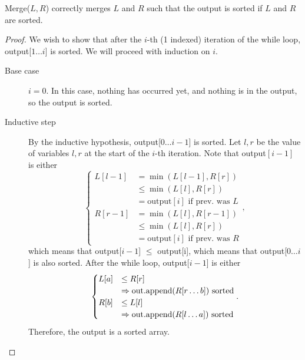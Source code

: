 \begin{lemma}
	Merge(\( L,R \)) correctly merges \( L \) and \( R \) such that the output is sorted if \( L \) and \( R \) are sorted.
\end{lemma}
\begin{proof}
	We wish to show that after the \( i \)-th (1 indexed) iteration of the while loop, output[\( 1\ldots i \)] is sorted. We will proceed with induction on \( i \).
	\begin{description}
		\item[Base case] \( i = 0 \). In this case, nothing has occurred yet, and nothing is in the output, so the output is sorted.
		\item[Inductive step] By the inductive hypothesis, output[\( 0\ldots i-1 \)] is sorted. Let \( l,r \) be the value of variables \( l,r \) at the start of the \( i \)-th iteration. Note that output\( [i-1]  \) is either\[
				\begin{cases}
					L[l-1] &= \min(L[l-1],R[r]) \\ &\le \min(L[l], R[r]) \\ &= \text{output}[i] \text{ if prev. was } L \\
					R[r-1] &= \min(L[l],R[r-1]) \\ &\le \min(L[l], R[r]) \\ &= \text{output}[i] \text{ if prev. was } R
				\end{cases}
			,\] which means that output[\( i-1 \)] \( \le  \) output[i], which means that output[\( 0\ldots i \)] is also sorted.
			After the while loop, output[\( i-1 \)] is either \[
				\begin{cases}
					L[a] &\le R[r] \\ &\implies \text{out.append(\( R[r\ldots b] \)) sorted} \\
					R[b] &\le L[l] \\ &\implies \text{out.append(\( R[l\ldots a] \)) sorted} \\
				\end{cases}
			.\] Therefore, the output is a sorted array.
	\end{description}
\end{proof}

